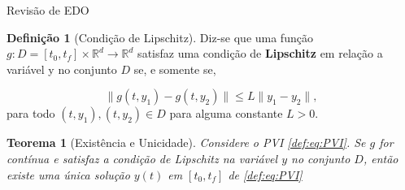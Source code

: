 \documentclass{beamer}
\newcommand{\R}{\mathbb{R}}
\theoremstyle{plain}
\newtheorem{teo}{Teorema}
\theoremstyle{definition}
\newtheorem{defi}{Definição}
\begin{document}
\begin{frame}{Revisão de EDO}

    \small
    \begin{defi}[Condição de Lipschitz]
        \label{def:2:condicao_de_lispchitz}
        Diz-se que uma função $g: D = [t_0, t_f] \times \R^d \to \R^d$ satisfaz uma condição de \textbf{Lipschitz} em relação a variável y no conjunto $D$ se, e somente se,

        \begin{equation}
            \| g(t, y_1) - g(t, y_2) \| \leq L \| y_1 - y_2 \|, 
            \label{def:IVP_Lips}
        \end{equation}
        para todo $(t, y_1), (t, y_2) \in D$ para alguma constante $L>0$.
    \end{defi}


    \begin{teo}[Existência e Unicidade]
        
    \label{teo:1:PVI:existencia_unicidade}
    Considere o PVI \eqref{def:eq:PVI}. Se $g$ for contínua e satisfaz a condição de Lipschitz na variável $y$ no conjunto $D$, então existe uma única solução $y(t)$ em $[t_0, t_f]$ de \eqref{def:eq:PVI} 
    \end{teo}


\end{frame}
\end{document}
